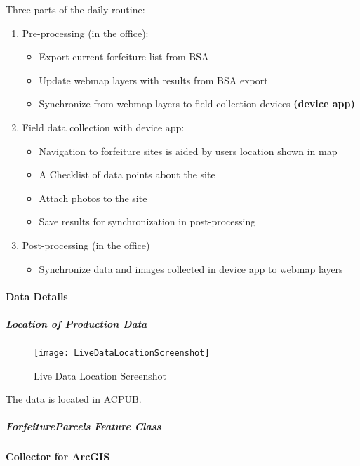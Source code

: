 \documentclass[class=article , crop=false, titlepage, twoside, multi={itemize, figure, verbatim}, float=false]{standalone}
\begin{document}
Three parts of the daily routine:
\begin{enumerate}
\item Pre-processing (in the office):

\begin{itemize}
\item Export current forfeiture list from BSA
\item Update webmap layers with results from BSA export
\item Synchronize from webmap layers to field collection devices \textbf{(device app)}
\end{itemize}

\item Field data collection with device app:

\begin{itemize}
\item Navigation to forfeiture sites is aided by users location shown in map
\item A Checklist of data points about the site
\item Attach photos to the site
\item Save results for synchronization in post-processing
\end{itemize}

\item Post-processing (in the office)

\begin{itemize}
\item Synchronize data and images collected in device app to webmap layers

\end{itemize}
\end{enumerate}

\paragraph{Data Details}
\subparagraph{Location of Production Data}
\begin{wrapfigure}{r}{0.5\textwidth}
\centering
\texttt{[image: LiveDataLocationScreenshot]}
\caption{Live Data Location Screenshot}
\end{wrapfigure}
The data is located in ACPUB.
\clearpage

\subparagraph{ForfeitureParcels Feature Class}

\paragraph{Collector for ArcGIS}
\end{document}
